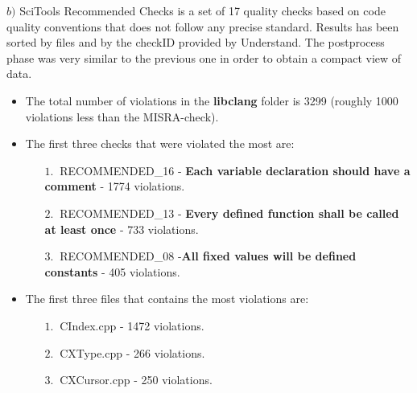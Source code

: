 \hspace{-0.6cm} \textbf{$b)$}  
SciTools Recommended Checks is a set of 17 quality checks based on code quality conventions that does not follow any precise standard.\newline
Results has been sorted by files and by the checkID provided by Understand. The postprocess phase was very similar to the previous one in order to obtain a compact view of data.\newline

\begin{itemize}
	\item The total number of violations in the \textbf{libclang} folder is 3299 (roughly 1000 violations less than the MISRA-check).
	\item The first three checks that were violated the most are:
	\begin{itemize}
		\item[$1.\:$] RECOMMENDED\_16 - \textbf{Each variable declaration should have a comment} - 1774 violations.\newline
		\item[$2.\:$] RECOMMENDED\_13 - \textbf{Every defined function shall be called at least once} - 733 violations.\newline 
		\item[$3.\:$] RECOMMENDED\_08 -\textbf{All fixed values will be defined constants} - 405 violations.\newline
	\end{itemize}
	\item The first three files that contains the most violations are:
		\begin{itemize}
		\item[$1.\:$] CIndex.cpp - 1472 violations.
		\item[$2.\:$] CXType.cpp - 266 violations.
		\item[$3.\:$] CXCursor.cpp - 250 violations.
	\end{itemize}
\end{itemize}


